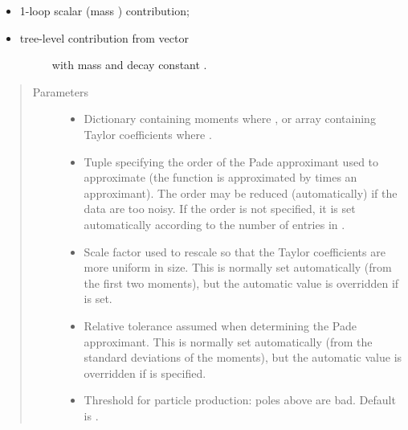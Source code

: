 \documentclass[letterpaper,10pt,english]{sphinxmanual}
\begin{document}
\begin{fulllineitems}
\begin{itemize}
\item {} 
 \textendash{} 1-loop scalar (mass ) contribution;

\item {} \begin{description}
\item[{ \textendash{} tree-level contribution from vector}] \leavevmode
with mass  and decay constant .

\end{description}

\end{itemize}
\begin{quote}\begin{description}
\item[{Parameters}] \leavevmode\begin{itemize}
\item {} 
 \textendash{} Dictionary containing moments where ,
or array containing Taylor coefficients where
.

\item {} 
 \textendash{} Tuple  specifying the order of the Pade
approximant used to approximate  (the function is
approximated by  times an  approximant). The
order may be reduced (automatically) if the data are too noisy. If
the order is not specified, it is set automatically according to
the number of entries in .

\item {} 
 \textendash{} Scale factor used to rescale  so that
the Taylor coefficients are more uniform in size. This is
normally set automatically (from the first two moments),
but the automatic value is overridden if  is set.

\item {} 
 \textendash{} Relative tolerance assumed when determining the
Pade approximant. This is normally set automatically
(from the standard deviations of the moments), but the
automatic value is overridden if  is specified.

\item {} 
 \textendash{} Threshold for particle production: poles above 
are bad. Default is .


\end{itemize}
\end{description}
\end{quote}
\end{fulllineitems}
\end{document}
